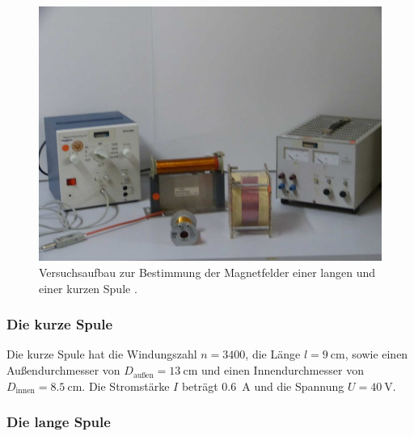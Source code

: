 \begin{figure}
    \centering
    \includegraphics[]{abbildungen/lange und kurze spule.png}
    \caption[]{Versuchsaufbau zur Bestimmung der Magnetfelder einer langen und einer kurzen Spule \cite[]{man:v308}.}
    \label{fig:lange_kurze_spule}
\end{figure}

\subsubsection{Die kurze Spule}
Die kurze Spule hat die Windungszahl $n = 3400$, die Länge $l = \qty[]{9}{\cm}$, sowie einen Außendurchmesser von 
$D_\text{außen} = \qty[]{13}{\cm}$ und einen Innendurchmesser von $D_\text{innen} = \qty[]{8.5}{\cm}$.
Die Stromstärke $I$ beträgt \qty[]{0.6}{\ampere} und die Spannung $U = \qty[]{40}{\volt}$.


\subsubsection{Die lange Spule}